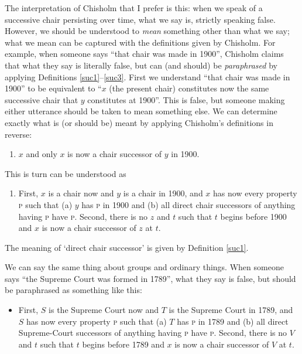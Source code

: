 \documentclass[11pt]{article}
\begin{document}
\begin{spacing}{1.5}
The interpretation of Chisholm that I prefer is this: when we speak of
a successive chair persisting over time, what we say is, strictly
speaking false.  However, we should be understood to {\em mean}
something other than what we say; what we mean can be captured with
the definitions given by Chisholm.  For example, when someone says
``that chair was made in 1900'', Chisholm claims that what they say is
literally false, but can (and should) be {\em paraphrased} by applying
Definitions \ref{suc1}--\ref{suc3}.  First we understand ``that chair
was made in 1900'' to be equivalent to ``$x$ (the present chair)
constitutes now the same successive chair that $y$ constitutes at
1900''.  This is false, but someone making either utterance should be
taken to mean something else.  We can determine exactly what is (or
should be) meant by applying Chisholm's definitions in reverse:

\begin{enumerate}[start=3]
  \item $x$ and only $x$ is now a chair successor of $y$ in 1900.
\end{enumerate}
This is turn can be understood as

\begin{enumerate}[start=2]
  \item First, $x$ is a chair now and $y$ is a chair in 1900, and $x$
    has now every property \textsc{p} such that (a) $y$ has \textsc{p}
    in 1900 and (b) all direct chair successors of anything having
    \textsc{p} have \textsc{p}.  Second, there is no $z$ and $t$ such
    that $t$ begins before 1900 and $x$ is now a chair successor of
    $z$ at $t$.
\end{enumerate}
The meaning of `direct chair successor' is given by Definition
\ref{suc1}.

We can say the same thing about groups and ordinary things.  When
someone says ``the Supreme Court was formed in 1789'', what they say
is false, but should be paraphrased as something like this:

\begin{itemize}
  \item First, $S$ is the Supreme Court now and $T$ is the Supreme
    Court in 1789, and $S$ has now every property \textsc{p} such that
    (a) $T$ has \textsc{p} in 1789 and (b) all direct Supreme-Court
    successors of anything having \textsc{p} have \textsc{p}.  Second,
    there is no $V$ and $t$ such that $t$ begins before 1789 and $x$
    is now a chair successor of $V$ at $t$.
\end{itemize}


\end{spacing}
\end{document}

